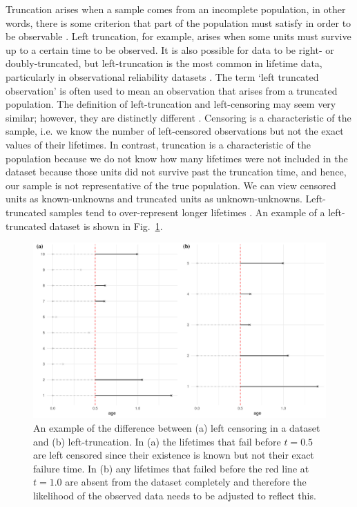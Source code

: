 Truncation arises when a sample comes from an incomplete population, in other words, there is some criterion that part of the population must satisfy in order to be observable \citep{guo1993}. Left truncation, for example, arises when some units must survive up to a certain time to be observed. It is also possible for data to be right- or doubly-truncated, but left-truncation is the most common in lifetime data, particularly in observational reliability datasets \citep{Emura2022}. The term `left truncated observation' is often used to mean an observation that arises from a truncated population. The definition of left-truncation and left-censoring may seem very similar; however, they are distinctly different \citep{mitra2013}. Censoring is a characteristic of the sample, i.e. we know the number of left-censored observations but not the exact values of their lifetimes. In contrast, truncation is a characteristic of the population because we do not know how many lifetimes were not included in the dataset because those units did not survive past the truncation time, and hence, our sample is not representative of the true population. We can view censored units as known-unknowns and truncated units as unknown-unknowns. Left-truncated samples tend to over-represent longer lifetimes \citep{guo1993}. An example of a left-truncated dataset is shown in Fig.~\ref{fig:left_trunc_example}.

\begin{figure}[h]
    \centering
    \includegraphics[width=1\textwidth]{./figures/ch-2/left_truncation_example.pdf}
    \caption{An example of the difference between (a) left censoring in a dataset and (b) left-truncation. In (a) the lifetimes that fail before $t = 0.5$ are left censored since their existence is known but not their exact failure time. In (b) any lifetimes that failed before the red line at $t = 1.0$ are absent from the dataset completely and therefore the likelihood of the observed data needs to be adjusted to reflect this.}
    \label{fig:left_trunc_example}
\end{figure}

